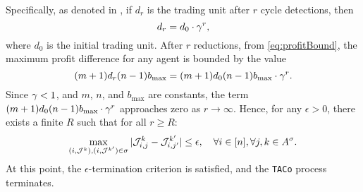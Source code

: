 \begin{customproof}
Specifically, as denoted in , if $d_r$ is the trading unit after $r$ cycle detections, then
\begin{equation}
d_r = d_0 \cdot \gamma^r,
\end{equation}
where $d_0$ is the initial trading unit. After $r$ reductions, from \cref{eq:profitBound}, the maximum profit difference for any agent is bounded by the value
\begin{equation} \label{eq:maxProfDiff_reduction}
(m+1)d_r(n-1)b_{\max} = (m+1)d_0(n-1)b_{\max} \cdot \gamma^r.
\end{equation}
Since $\gamma < 1$, and $m$, $n$, and $b_{\max}$ are constants, the term $(m+1)d_0(n-1)b_{\max} \cdot \gamma^r$ approaches zero as $r \to \infty$. Hence, for any $\epsilon > 0$, there exists a finite $R$ such that for all $r \geq R$: 
\begin{equation} \label{eq:maxProfDiff_epsilon}
\max_{(i,\mathcal{J}^k),(i,\mathcal{J}^{k'})\in\sigma} |\mathcal{J}^k_{i, j} - \mathcal{J}^{k'}_{i, j'}| \leq \epsilon, \quad \forall i \in [n], \forall j, k \in A^\sigma.
\end{equation}
At this point, the $\epsilon$-termination criterion is satisfied, and the \texttt{TACo} process terminates. 
\end{customproof}

